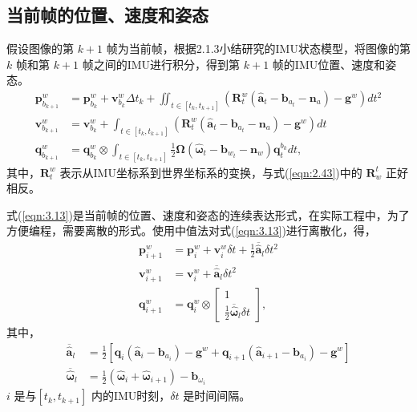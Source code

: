 \subsection{当前帧的位置、速度和姿态}
假设图像的第 $k+1$  帧为当前帧，根据2.1.3小结研究的IMU状态模型，将图像的第 $k$  帧和第 $k+1$  帧之间的IMU进行积分，得到第 $k+1$ 帧的IMU位置、速度和姿态。
\begin{equation}
\label{eqn:3.13}
\begin{split}
\mathbf{p}_{b_{k+1}}^w&=\mathbf{p}_{b_k}^w+\mathbf{v}_{b_k}^w\Delta t_k+\iint_{t\in[t_k,t_{k+1}]}(\mathbf{R}_t^w(\hat{\mathbf{a}}_t-\mathbf{b}_{a_t}-\mathbf{n}_a)-\mathbf{g}^w)dt^2 \\
\mathbf{v}_{b_{k+1}}^w&=\mathbf{v}_{b_k}^w+\int_{t\in[t_k,t_{k+1}]}(\mathbf{R}_t^w(\hat{\mathbf{a}}_t-\mathbf{b}_{a_t}-\mathbf{n}_a)-\mathbf{g}^w)dt \\
\mathbf{q}_{b_{k+1}}^w&=\mathbf{q}_{b_k}^w \otimes \int_{t\in[t_k,t_{k+1}]}\frac{1}{2}\bm{\Omega}(\hat{\bm{\omega}}_t-\mathbf{b}_{w_t}-\mathbf{n}_w)\mathbf{q}_t^{b_k}dt,
\end{split}
\end{equation}
其中，$\mathbf{R}_t^w $ 表示从IMU坐标系到世界坐标系的变换，与式(\ref{eqn:2.43})中的 $\mathbf{R}_w^t $ 正好相反。

式(\ref{eqn:3.13})是当前帧的位置、速度和姿态的连续表达形式，在实际工程中，为了方便编程，需要离散的形式。使用中值法对式(\ref{eqn:3.13})进行离散化，得，
\begin{equation}
\label{eqn:3.14}
\begin{split}
\mathbf{p}_{{i+1}}^w&=\mathbf{p}_{i}^w+\mathbf{v}_{i}^w\delta t+\frac{1}{2} \overline{\hat{\mathbf{a}}}_{l} \delta t ^{2} \\
\mathbf{v}_{{i+1}}^w&=\mathbf{v}_{i}^w+ \overline{\hat{\mathbf{a}}}_{l} \delta t^{2}\\
\mathbf{q}_{{i+1}}^w&=\mathbf{q}_{i}^w\otimes \begin{bmatrix} 1\\ \frac{1}{2} \overline{\hat{\bm{\omega}}}_{l} \delta t\end{bmatrix},
\end{split}
\end{equation}
其中，
\begin{equation}
\label{eqn:3.15}
\begin{aligned}
\overline{\hat{\mathbf{a}}}_{l} &= \frac{1}{2}\left[\mathbf{q}_{i}\left(\hat{ \mathbf{a}}_{i}-\mathbf{b}_{a_{i}}\right)-\mathbf{g}^{w}+\mathbf{q}_{i+1}\left(\hat{\mathbf{a}}_{i+1}-\mathbf{b}_{a_{i}}\right)-\mathbf{g}^{w}\right] \\ 
\overline{\hat{{\bm{\omega}}}}_{l}   &= \frac{1}{2}\left(\hat{\bm{\omega}}_{i}+\hat{\bm{\omega}}_{i+1}\right)-\mathbf{b}_{\omega_{i}}
\end{aligned}
\end{equation}
$i$ 是与$[t_k,t_{k+1}] $ 内的IMU时刻，$\delta t $ 是时间间隔。
